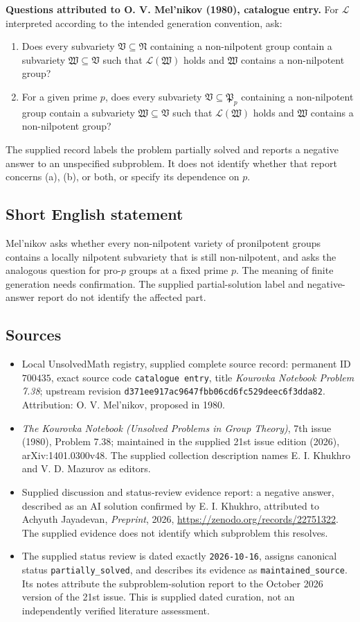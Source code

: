 \documentclass[11pt]{article}
\begin{document}
\textbf{Questions attributed to O. V. Mel'nikov (1980), catalogue entry.} For $\mathcal L$ interpreted according to the intended generation convention, ask:
\begin{enumerate}
\item[(a)] Does every subvariety $\mathfrak V\subseteq\mathfrak N$ containing a non-nilpotent group contain a subvariety $\mathfrak W\subseteq\mathfrak V$ such that $\mathcal L(\mathfrak W)$ holds and $\mathfrak W$ contains a non-nilpotent group?
\item[(b)] For a given prime $p$, does every subvariety $\mathfrak V\subseteq\mathfrak P_p$ containing a non-nilpotent group contain a subvariety $\mathfrak W\subseteq\mathfrak V$ such that $\mathcal L(\mathfrak W)$ holds and $\mathfrak W$ contains a non-nilpotent group?
\end{enumerate}
The supplied record labels the problem partially solved and reports a negative answer to an unspecified subproblem. It does not identify whether that report concerns (a), (b), or both, or specify its dependence on $p$.
\subsection{Short English statement}
Mel'nikov asks whether every non-nilpotent variety of pronilpotent groups contains a locally nilpotent subvariety that is still non-nilpotent, and asks the analogous question for pro-$p$ groups at a fixed prime $p$. The meaning of finite generation needs confirmation. The supplied partial-solution label and negative-answer report do not identify the affected part.
\subsection{Sources}
\begin{itemize}
\item Local UnsolvedMath registry, supplied complete source record: permanent ID $700435$, exact source code \texttt{catalogue entry}, title \emph{Kourovka Notebook Problem 7.38}; upstream revision \texttt{d371ee917ac9647fbb06cd6fc529deec6f3dda82}. Attribution: O. V. Mel'nikov, proposed in 1980.
\item \emph{The Kourovka Notebook (Unsolved Problems in Group Theory)}, 7th issue (1980), Problem 7.38; maintained in the supplied 21st issue edition (2026), arXiv:1401.0300v48. The supplied collection description names E. I. Khukhro and V. D. Mazurov as editors.
\item Supplied discussion and status-review evidence report: a negative answer, described as an AI solution confirmed by E. I. Khukhro, attributed to Achyuth Jayadevan, \emph{Preprint}, 2026, \url{https://zenodo.org/records/22751322}. The supplied evidence does not identify which subproblem this resolves.
\item The supplied status review is dated exactly \texttt{2026-10-16}, assigns canonical status \texttt{partially\_solved}, and describes its evidence as \texttt{maintained\_source}. Its notes attribute the subproblem-solution report to the October 2026 version of the 21st issue. This is supplied dated curation, not an independently verified literature assessment.
\end{itemize}
\end{document}
